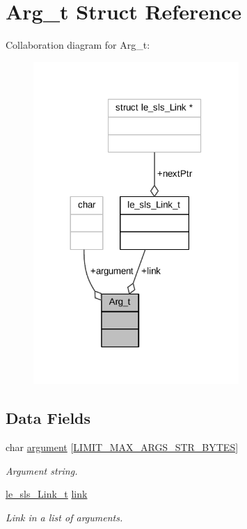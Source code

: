 \hypertarget{struct_arg__t}{}\section{Arg\+\_\+t Struct Reference}
\label{struct_arg__t}


Collaboration diagram for Arg\+\_\+t\+:
\nopagebreak
\begin{figure}[H]
\begin{center}
\leavevmode
\includegraphics[width=221pt]{struct_arg__t__coll__graph}
\end{center}
\end{figure}
\subsection*{Data Fields}
\begin{DoxyCompactItemize}
\item 
char \hyperlink{struct_arg__t_a3833ee81ada43b713e503c1db3ecd7be}{argument} \mbox{[}\hyperlink{limit_8h_a114bcf4f0392737194fe523f88b51ba2}{L\+I\+M\+I\+T\+\_\+\+M\+A\+X\+\_\+\+A\+R\+G\+S\+\_\+\+S\+T\+R\+\_\+\+B\+Y\+T\+ES}\mbox{]}
\begin{DoxyCompactList}\small\item\em Argument string. \end{DoxyCompactList}\item 
\hyperlink{structle__sls___link__t}{le\+\_\+sls\+\_\+\+Link\+\_\+t} \hyperlink{struct_arg__t_a661113a2077bc1d29dbf9b64fdb30804}{link}
\begin{DoxyCompactList}\small\item\em Link in a list of arguments. \end{DoxyCompactList}\end{DoxyCompactItemize}


